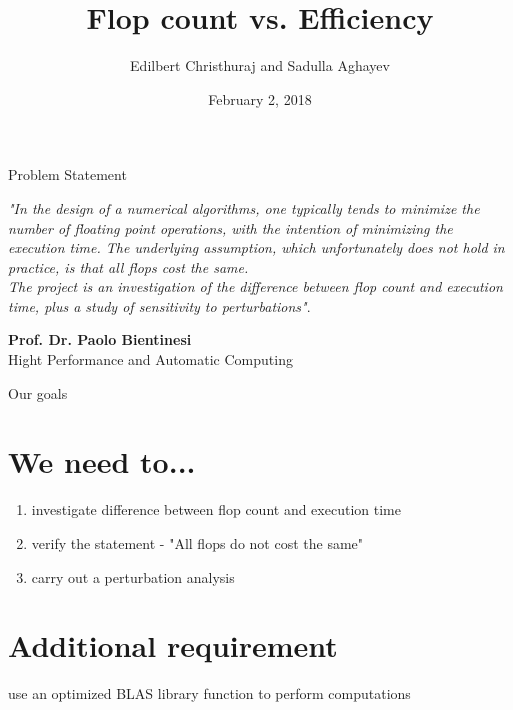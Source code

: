 \documentclass[10pts]{beamer}
\title[Matrix chain Problem]{Flop count vs. Efficiency}
\author{Edilbert Christhuraj and Sadulla Aghayev}
\institute{RWTH Aachen}
\date{February 2, 2018}
\begin{document}
   
   \begin{frame}
   	\titlepage
   \end{frame}
	 
	    \begin{frame}[t]{Problem Statement} \vspace{10pt}
	    
	    \textit{"In the design of a numerical algorithms, one typically tends to minimize the number of floating point operations, with the intention of minimizing the execution time. The underlying assumption, which unfortunately does not hold in practice, is that all flops cost the same.\\ \vspace{2pt}
	    The project is an investigation of the difference between flop count and execution time, plus a study of sensitivity to perturbations"}.\vspace{20pt}
	
     	\hspace{160pt} \textbf{Prof. Dr. Paolo Bientinesi}\\
     		\hspace{86pt} Hight Performance and Automatic Computing\\
		
		\end{frame}
	   	
	   	 \begin{frame}[t]{Our goals }\vspace{5pt}
	   	 	\section{We need to...}
	   	 	\begin{enumerate}[(\roman{*})]
	   	 		\item investigate difference between flop count and execution time
	   	 		\item verify the statement - "All flops do not cost the same"
	   	 		\item carry out a perturbation analysis
	   	 	\end{enumerate} 
	   	 	\section{Additional requirement} 
	   	 	 use an optimized BLAS library function to perform computations    
	   	 \end{frame}
	   	 
\end{document}

